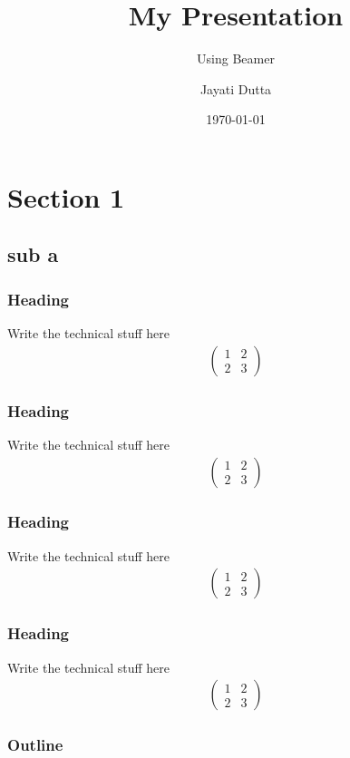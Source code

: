 \documentclass{beamer}
\title{My Presentation}
\subtitle{Using Beamer}
\author{Jayati Dutta}
\institute{IITH}
\date{\today}
\begin{document}
\begin{frame}
\titlepage
\end{frame}
\section{Section 1}
\subsection{sub a}

\begin{frame}
\frametitle{Heading}
Write the technical stuff here
\begin{align}
\begin{pmatrix}
1 & 2\\2 & 3
\end{pmatrix}
\end{align}
\end{frame}

\begin{frame}
\frametitle{Heading}
Write the technical stuff here
\begin{align}
\begin{pmatrix}
1 & 2\\2 & 3
\end{pmatrix}
\end{align}
\end{frame}

\begin{frame}
\frametitle{Heading}
Write the technical stuff here
\begin{align}
\begin{pmatrix}
1 & 2\\2 & 3
\end{pmatrix}
\end{align}
\end{frame}

\begin{frame}
\frametitle{Heading}
Write the technical stuff here
\begin{align}
\begin{pmatrix}
1 & 2\\2 & 3
\end{pmatrix}
\end{align}
\end{frame}

\begin{frame}
\frametitle{Outline}
\tableofcontents
\end{frame}
\end{document}
